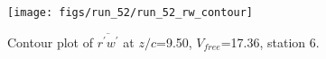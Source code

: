 \begin{figure}[H]
\centering
\texttt{[image: figs/run\_52/run\_52\_rw\_contour]}
\caption{Contour plot of $\overline{r^\prime w^\prime}$ at $z/c$=9.50, $V_{free}$=17.36, station 6.}
\label{fig:run_52_rw_contour}
\end{figure}


